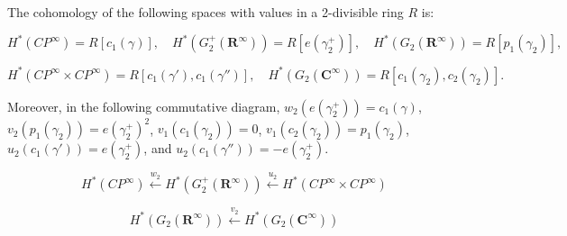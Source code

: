 The cohomology of the following spaces with values in a 2-divisible ring $R$ is:

$$H^*(CP^\infty) = R[c_1(\gamma)], \quad H^*(G_2^+(\mathbf{R}^\infty)) = R[e(\gamma_2^+)], \quad H^*(G_2(\mathbf{R}^\infty)) = R[p_1(\gamma_2)],$$

$$H^*(CP^\infty \times CP^\infty) = R[c_1(\gamma'), c_1(\gamma'')], \quad H^*(G_2(\mathbf{C}^\infty)) = R[c_1(\gamma_2), c_2(\gamma_2)].$$

Moreover, in the following commutative diagram, $w_2(e(\gamma_2^+)) = c_1(\gamma)$, $v_2(p_1(\gamma_2)) = e(\gamma_2^+)^2$, $v_1(c_1(\gamma_2)) = 0$, $v_1(c_2(\gamma_2)) = p_1(\gamma_2)$, $u_2(c_1(\gamma')) = e(\gamma_2^+)$, and $u_2(c_1(\gamma'')) = -e(\gamma_2^+)$.

$$H^*(CP^\infty) \xleftarrow{w_2} H^*(G_2^+(\mathbf{R}^\infty)) \xleftarrow{u_2} H^*(CP^\infty \times CP^\infty)$$

$$H^*(G_2(\mathbf{R}^\infty)) \xleftarrow{v_2} H^*(G_2(\mathbf{C}^\infty))$$
